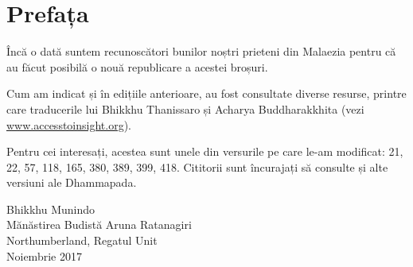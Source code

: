 \chapter[Prefața ediției a cincea (2017)]{Prefața}

Încă o dată suntem recunoscători bunilor noștri prieteni din Malaezia pentru că au făcut posibilă o nouă republicare a acestei broșuri.

Cum am indicat și în edițiile anterioare, au fost consultate diverse resurse, printre care traducerile lui Bhikkhu Thanissaro și Acharya Buddharakkhita
(vezi \href{http://accesstoinsight.org}{www.accesstoinsight.org}).

Pentru cei interesați, acestea sunt unele din versurile pe care le-am modificat: 21, 22, 57, 118, 165, 380, 389, 399, 418. Cititorii sunt încurajați să consulte și alte versiuni ale Dhammapada.

\bigskip

{\raggedleft
Bhikkhu Munindo\\
Mănăstirea Budistă Aruna Ratanagiri\\
Northumberland, Regatul Unit\\
Noiembrie 2017
\par}
